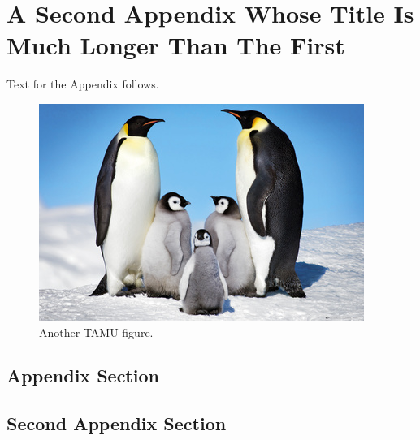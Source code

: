 %
%
%
%


\chapter{A Second Appendix Whose Title Is Much Longer Than The First}\label{appendix:02}

Text for the Appendix follows.

\begin{figure}[h]
\centering
\includegraphics[scale=.50]{figures/Penguins.jpg}
\caption{Another TAMU figure.}
\label{fig:tamu-fig6}
\end{figure}

\section{Appendix Section}

\section{Second Appendix Section}